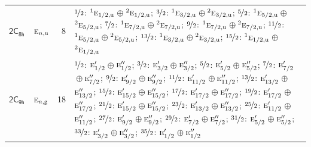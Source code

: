 \documentclass[10pt,a4paper]{article}
\numberwithin{equation}{section}
\newcommand{\grp}[1]{\mathsf{#1}}
\newcommand{\irr}[1]{\text{\normalfont\scshape #1}}
\newcommand{\conjpair}[1]{{}^{#1}}
\newcommand{\ptag}[1]{\mathrm{#1}}
\newlength{\fillwidth}\newlength{\cellwidth}\newlength{\colwidth}
\begin{document}
{\begin{longtable}{@{}llr>{\RaggedRight\arraybackslash}p{\fillwidth}@{}}
\href{2C8h.pdf}{$\grp{2C_{8h}}$} & $\irr{e}_{n,\ptag{u}}$ & 8 & $\nicefrac{1}{2}$: $\conjpair{1}\irr{e}_{1/2,\ptag{u}}$${}\oplus{}$$\conjpair{2}\irr{e}_{1/2,\ptag{u}}$; $\nicefrac{3}{2}$: $\conjpair{1}\irr{e}_{3/2,\ptag{u}}$${}\oplus{}$$\conjpair{2}\irr{e}_{3/2,\ptag{u}}$; $\nicefrac{5}{2}$: $\conjpair{1}\irr{e}_{5/2,\ptag{u}}$${}\oplus{}$$\conjpair{2}\irr{e}_{5/2,\ptag{u}}$; $\nicefrac{7}{2}$: $\conjpair{1}\irr{e}_{7/2,\ptag{u}}$${}\oplus{}$$\conjpair{2}\irr{e}_{7/2,\ptag{u}}$; $\nicefrac{9}{2}$: $\conjpair{1}\irr{e}_{7/2,\ptag{u}}$${}\oplus{}$$\conjpair{2}\irr{e}_{7/2,\ptag{u}}$; $\nicefrac{11}{2}$: $\conjpair{1}\irr{e}_{5/2,\ptag{u}}$${}\oplus{}$$\conjpair{2}\irr{e}_{5/2,\ptag{u}}$; $\nicefrac{13}{2}$: $\conjpair{1}\irr{e}_{3/2,\ptag{u}}$${}\oplus{}$$\conjpair{2}\irr{e}_{3/2,\ptag{u}}$; $\nicefrac{15}{2}$: $\conjpair{1}\irr{e}_{1/2,\ptag{u}}$${}\oplus{}$$\conjpair{2}\irr{e}_{1/2,\ptag{u}}$\\
\href{2C9h.pdf}{$\grp{2C_{9h}}$} & $\irr{e}_{n,\ptag{g}}$ & 18 & $\nicefrac{1}{2}$: $\irr{e}_{1/2}'$${}\oplus{}$$\irr{e}_{1/2}''$; $\nicefrac{3}{2}$: $\irr{e}_{3/2}'$${}\oplus{}$$\irr{e}_{3/2}''$; $\nicefrac{5}{2}$: $\irr{e}_{5/2}'$${}\oplus{}$$\irr{e}_{5/2}''$; $\nicefrac{7}{2}$: $\irr{e}_{7/2}'$${}\oplus{}$$\irr{e}_{7/2}''$; $\nicefrac{9}{2}$: $\irr{e}_{9/2}'$${}\oplus{}$$\irr{e}_{9/2}''$; $\nicefrac{11}{2}$: $\irr{e}_{11/2}'$${}\oplus{}$$\irr{e}_{11/2}''$; $\nicefrac{13}{2}$: $\irr{e}_{13/2}'$${}\oplus{}$$\irr{e}_{13/2}''$; $\nicefrac{15}{2}$: $\irr{e}_{15/2}'$${}\oplus{}$$\irr{e}_{15/2}''$; $\nicefrac{17}{2}$: $\irr{e}_{17/2}'$${}\oplus{}$$\irr{e}_{17/2}''$; $\nicefrac{19}{2}$: $\irr{e}_{17/2}'$${}\oplus{}$$\irr{e}_{17/2}''$; $\nicefrac{21}{2}$: $\irr{e}_{15/2}'$${}\oplus{}$$\irr{e}_{15/2}''$; $\nicefrac{23}{2}$: $\irr{e}_{13/2}'$${}\oplus{}$$\irr{e}_{13/2}''$; $\nicefrac{25}{2}$: $\irr{e}_{11/2}'$${}\oplus{}$$\irr{e}_{11/2}''$; $\nicefrac{27}{2}$: $\irr{e}_{9/2}'$${}\oplus{}$$\irr{e}_{9/2}''$; $\nicefrac{29}{2}$: $\irr{e}_{7/2}'$${}\oplus{}$$\irr{e}_{7/2}''$; $\nicefrac{31}{2}$: $\irr{e}_{5/2}'$${}\oplus{}$$\irr{e}_{5/2}''$; $\nicefrac{33}{2}$: $\irr{e}_{3/2}'$${}\oplus{}$$\irr{e}_{3/2}''$; $\nicefrac{35}{2}$: $\irr{e}_{1/2}'$${}\oplus{}$$\irr{e}_{1/2}''$\\

\end{longtable}}
\end{document}
